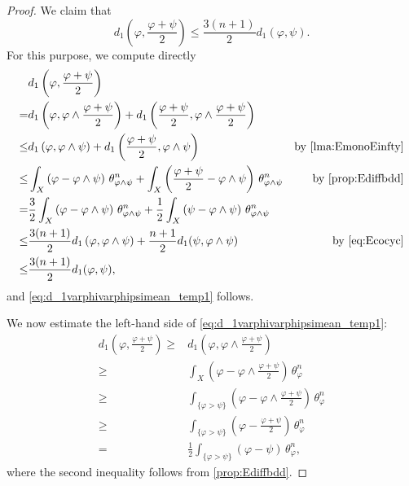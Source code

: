 \begin{proof}
    We claim that
    \begin{equation}\label{eq:d_1varphivarphipsimean_temp1}
        d_1\left(\varphi,\frac{\varphi+\psi}{2}\right)\leq \frac{3(n+1)}{2} d_1(\varphi,\psi).
    \end{equation}
    For this purpose, we compute directly
    \[
    \begin{aligned}
        &d_1\left(\varphi,\frac{\varphi+\psi}{2}\right)\\
        =&d_1\left(\varphi,\varphi\land \frac{\varphi+\psi}{2}\right)+d_1\left(\frac{\varphi+\psi}{2},\varphi\land \frac{\varphi+\psi}{2}\right)\\
        \leq & d_1\left(\varphi,\varphi\land \psi\right)+d_1\left(\frac{\varphi+\psi}{2},\varphi\land\psi\right)&\textup{by \cref{lma:EmonoEinfty}}\\
        \leq & \int_X \left( \varphi-\varphi\land\psi\right)\,\theta_{\varphi\land\psi}^n+ \int_X \left( \frac{\varphi+\psi}{2}-\varphi\land\psi\right)\,\theta_{\varphi\land \psi}^n &\textup{by \cref{prop:Ediffbdd}}\\
        =& \frac{3}{2}\int_X \left( \varphi-\varphi\land\psi\right)\,\theta_{\varphi\land\psi}^n+\frac{1}{2}\int_X \left( \psi-\varphi\land\psi\right)\,\theta_{\varphi\land\psi}^n \\
        \leq & \frac{3(n+1)}{2}d_1\left(\varphi,\varphi\land \psi\right) + \frac{n+1}{2}d_1(\psi,\varphi\land \psi)& \textup{by \eqref{eq:Ecocyc}}\\
        \leq & \frac{3(n+1)}{2}d_1(\varphi,\psi),
    \end{aligned}
    \]
    and \eqref{eq:d_1varphivarphipsimean_temp1} follows.

    We now estimate the left-hand side of \eqref{eq:d_1varphivarphipsimean_temp1}:
    \[
    \begin{aligned}
    d_1\left(\varphi,\frac{\varphi+\psi}{2}\right)\geq & d_1\left(\varphi,\varphi\land \frac{\varphi+\psi}{2}\right)\\
    \geq & \int_X \left(\varphi-\varphi\land \frac{\varphi+\psi}{2}\right)\,\theta_{\varphi}^n\\
    \geq & \int_{\{\varphi>\psi\}}\left(\varphi-\varphi\land \frac{\varphi+\psi}{2}\right)\,\theta_{\varphi}^n \\
    \geq & \int_{\{\varphi>\psi\}}\left(\varphi-\frac{\varphi+\psi}{2}\right)\,\theta_{\varphi}^n\\
    =& \frac{1}{2}\int_{\{\varphi>\psi\}}\left(\varphi-\psi\right)\,\theta_{\varphi}^n,
    \end{aligned}
    \]
    where the second inequality follows from \cref{prop:Ediffbdd}.


\end{proof}

